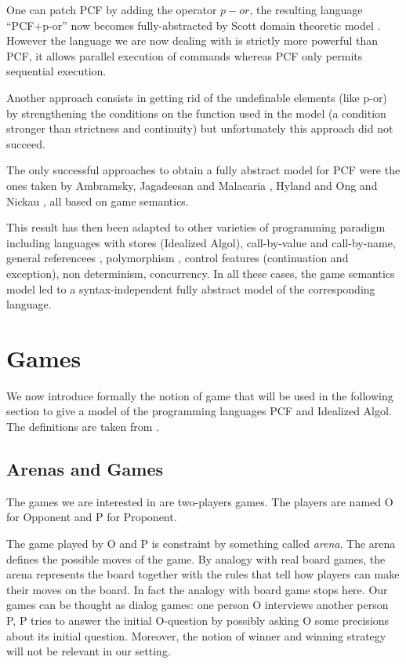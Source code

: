 One can patch PCF by adding the operator $p-or$, the resulting
language ``PCF+p-or'' now becomes fully-abstracted by Scott domain
theoretic model \citep{DBLP:journals/tcs/Plotkin77}. However the
language we are now dealing with is strictly more powerful than PCF,
it allows parallel execution of commands whereas PCF only permits
sequential execution.

Another approach consists in getting rid of the undefinable elements
(like p-or) by strengthening the conditions on the function used in
the model (a condition stronger than strictness and continuity) but
unfortunately this approach did not succeed.

The only successful approaches to obtain a fully abstract model for
PCF were the ones taken by Ambramsky, Jagadeesan and Malacaria
\citep{abramsky94full}, Hyland and Ong \citep{hylandong_pcf} and
Nickau \citep{Nickau:lfcs94}, all based on game semantics.

This result has then been adapted to other varieties of programming
paradigm including languages with stores (Idealized Algol),
call-by-value \citep{honda99gametheoretic, abramsky98callbyvalue}
and call-by-name, general referencees
\citep{DBLP:conf/lics/AbramskyHM98}, polymorphism
\citep{DBLP:journals/apal/AbramskyJ05}, control features
(continuation and exception), non determinism, concurrency. In all
these cases, the game semantics model led to a syntax-independent
fully abstract model of the corresponding language.

\section{Games}
\label{sec:catgames}

We now introduce formally the notion of game that will be used in
the following section to give a model of the programming languages
PCF and Idealized Algol. The definitions are taken from
\cite{abramsky:game-semantics, hylandong_pcf, abramsky94full}.


\subsection{Arenas and Games}

The games we are interested in are two-players games. The players are named O for Opponent and P for Proponent.

The game played by O and P is constraint by something called
\emph{arena}. The arena defines the possible moves of the game. By
analogy with real board games, the arena represents the board
together with the rules that tell how players can make their moves
on the board. In fact the analogy with board game stops here. Our
games can be thought as dialog games: one person O interviews
another person P, P tries to answer the initial O-question by
possibly asking O some precisions about its initial question.
Moreover, the notion of winner and winning strategy will not be
relevant in our setting.


